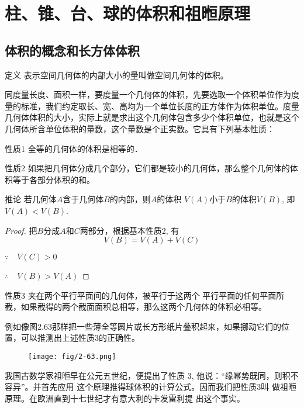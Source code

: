 \section{柱、锥、台、球的体积和祖暅原理}

\subsection{体积的概念和长方体体积}
\begin{blk}
    {定义} 表示空间几何体的内部大小的量叫做空间几何体的体积。
\end{blk}

同度量长度、面积一样，要度量一个几何体的体积，先要选取一个体积单位作为度量的标准，我们约定取长、宽、高均为一个单位长度的正方体作为体积单位。度量几何体体积的大小，实际上就是求出这个几何体包含多少个体积单位，也就是这个几何体所含单位体积的量数，这个量数是个正实数。它具有下列基本性质：

\begin{blk}{性质1}
    全等的几何体的体积是相等的．
\end{blk}


\begin{blk}{性质2}
    如果把几何体分成几个部分，它们都是较小的几何体，那么整个几何体的体积等于各部分体积的和。
\end{blk}

\begin{blk}
  {推论} 若几何体$A$含于几何体$B$的内部，则$A$的体积
$V(A)$小于$B$的体积$V(B)$, 即$V(A)<V(B)$.  
\end{blk}

\begin{proof}
 把$B$分成$A$和$C$两部分，根据基本性质2, 有
\[V(B)=V(A)+V(C)\]

$\because\quad V (C) > 0$

$\therefore\quad  V (B) > V (A)$   
\end{proof}

\begin{blk}{性质3}
    夹在两个平行平面间的几何体，被平行于这两个
平行平面的任何平面所截，如果截得的两个截面面积总相等，那么这两个几何体的体积必相等。
\end{blk}

例如像图2.63那样把一些薄全等圆片或长方形纸片叠积起来，如果挪动它们的位置，可以推测出上述性质3的正确性。
\begin{figure}[htp]
    \centering
\texttt{[image: fig/2-63.png]}
    \caption{}
\end{figure}

我国古数学家祖暅早在公元五世纪，便提出了性质
3, 他说：“缘幂势既同，则积不容异”。并首先应用
这个原理推得球体积的计算公式。因而我们把性质3叫
做祖暅原理。在欧洲直到十七世纪才有意大利的卡发雷利提
出这个事实。

